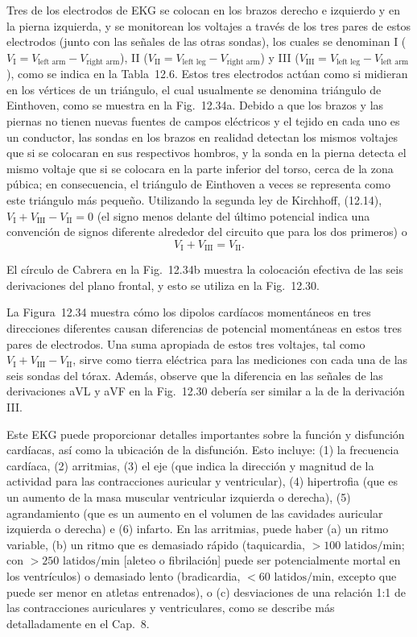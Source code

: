 \documentclass[12pt]{book}
\begin{document}
Tres de los electrodos de EKG se colocan en los brazos derecho e izquierdo y en la pierna izquierda, y se monitorean los voltajes a través de los tres pares de estos electrodos (junto con las señales de las otras sondas), los cuales se denominan I ($V_{\text{I}} = V_{\text{left arm}} - V_{\text{right arm}}$), II ($V_{\text{II}} = V_{\text{left leg}} - V_{\text{right arm}}$) y III ($V_{\text{III}} = V_{\text{left leg}} - V_{\text{left arm}}$), como se indica en la Tabla~12.6. Estos tres electrodos actúan como si midieran en los vértices de un triángulo, el cual usualmente se denomina triángulo de Einthoven, como se muestra en la Fig.~12.34a. Debido a que los brazos y las piernas no tienen nuevas fuentes de campos eléctricos y el tejido en cada uno es un conductor, las sondas en los brazos en realidad detectan los mismos voltajes que si se colocaran en sus respectivos hombros, y la sonda en la pierna detecta el mismo voltaje que si se colocara en la parte inferior del torso, cerca de la zona púbica; en consecuencia, el triángulo de Einthoven a veces se representa como este triángulo más pequeño. Utilizando la segunda ley de Kirchhoff, (12.14), $V_{\text{I}} + V_{\text{III}} - V_{\text{II}} = 0$ (el signo menos delante del último potencial indica una convención de signos diferente alrededor del circuito que para los dos primeros) o
\begin{equation}
V_{\text{I}} + V_{\text{III}} = V_{\text{II}}.
\label{eq:12.88}
\end{equation}

El círculo de Cabrera en la Fig.~12.34b muestra la colocación efectiva de las seis derivaciones del plano frontal, y esto se utiliza en la Fig.~12.30.

La Figura~12.34 muestra cómo los dipolos cardíacos momentáneos en tres direcciones diferentes causan diferencias de potencial momentáneas en estos tres pares de electrodos. Una suma apropiada de estos tres voltajes, tal como $V_{\text{I}} + V_{\text{III}} - V_{\text{II}}$, sirve como tierra eléctrica para las mediciones con cada una de las seis sondas del tórax. Además, observe que la diferencia en las señales de las derivaciones aVL y aVF en la Fig.~12.30 debería ser similar a la de la derivación III.

Este EKG puede proporcionar detalles importantes sobre la función y disfunción cardíacas, así como la ubicación de la disfunción. Esto incluye: (1) la frecuencia cardíaca, (2) arritmias, (3) el eje (que indica la dirección y magnitud de la actividad para las contracciones auricular y ventricular), (4) hipertrofia (que es un aumento de la masa muscular ventricular izquierda o derecha), (5) agrandamiento (que es un aumento en el volumen de las cavidades auricular izquierda o derecha) e (6) infarto. En las arritmias, puede haber (a) un ritmo variable, (b) un ritmo que es demasiado rápido (taquicardia, $>100\text{ latidos/min}$; con $>250\text{ latidos/min}$ [aleteo o fibrilación] puede ser potencialmente mortal en los ventrículos) o demasiado lento (bradicardia, $<60\text{ latidos/min}$, excepto que puede ser menor en atletas entrenados), o (c) desviaciones de una relación 1:1 de las contracciones auriculares y ventriculares, como se describe más detalladamente en el Cap.~8.
\end{document}
